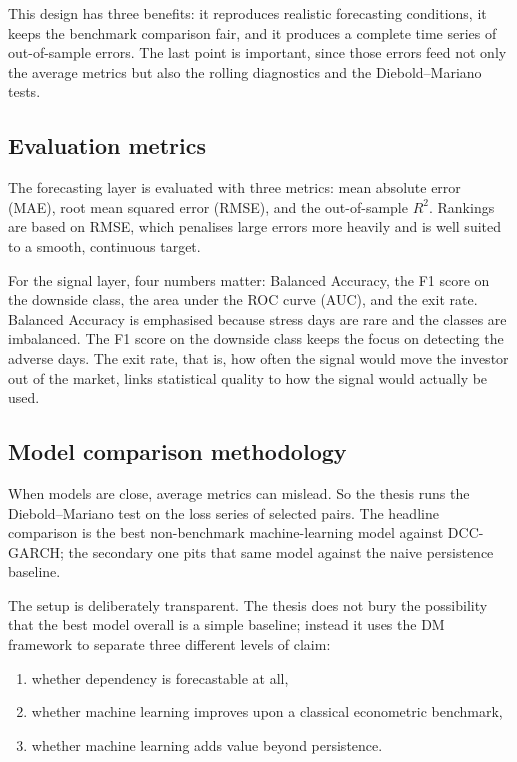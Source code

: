 This design has three benefits: it reproduces realistic forecasting conditions, it keeps the benchmark comparison fair, and it produces a complete time series of out-of-sample errors. The last point is important, since those errors feed not only the average metrics but also the rolling diagnostics and the Diebold--Mariano tests.

\subsection{Evaluation metrics}

The forecasting layer is evaluated with three metrics: mean absolute error (MAE), root mean squared error (RMSE), and the out-of-sample $R^2$. Rankings are based on RMSE, which penalises large errors more heavily and is well suited to a smooth, continuous target.

For the signal layer, four numbers matter: Balanced Accuracy, the F1 score on the downside class, the area under the ROC curve (AUC), and the exit rate. Balanced Accuracy is emphasised because stress days are rare and the classes are imbalanced. The F1 score on the downside class keeps the focus on detecting the adverse days. The exit rate, that is, how often the signal would move the investor out of the market, links statistical quality to how the signal would actually be used.

\subsection{Model comparison methodology}

When models are close, average metrics can mislead. So the thesis runs the Diebold--Mariano test on the loss series of selected pairs. The headline comparison is the best non-benchmark machine-learning model against DCC-GARCH; the secondary one pits that same model against the naive persistence baseline.

The setup is deliberately transparent. The thesis does not bury the possibility that the best model overall is a simple baseline; instead it uses the DM framework to separate three different levels of claim:

\begin{enumerate}
    \item whether dependency is forecastable at all,
    \item whether machine learning improves upon a classical econometric benchmark,
    \item whether machine learning adds value beyond persistence.
\end{enumerate}

